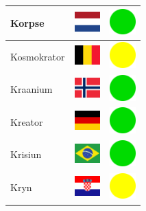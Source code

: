 \documentclass[12pt, a4paper, twoside]{report}
\begin{document}
\begin{center}
\begin{longtable}{|p{5cm}|p{2cm}|p{2cm}|}
 Korpse                                                     & \includegraphics[width=1cm]{../4x3/nl} &   \includegraphics[width=1cm]{../likes/y} \\ \hline
 Kosmokrator                                                & \includegraphics[width=1cm]{../4x3/be} &   \includegraphics[width=1cm]{../likes/m} \\ \hline
 Kraanium                                                   & \includegraphics[width=1cm]{../4x3/no} &   \includegraphics[width=1cm]{../likes/y} \\ \hline
 Kreator                                                    & \includegraphics[width=1cm]{../4x3/de} &   \includegraphics[width=1cm]{../likes/y} \\ \hline
 Krisiun                                                    & \includegraphics[width=1cm]{../4x3/br} &   \includegraphics[width=1cm]{../likes/y} \\ \hline
 Kryn                                                       & \includegraphics[width=1cm]{../4x3/hr} &   \includegraphics[width=1cm]{../likes/m} \\ \hline

\end{longtable}
\end{center}
\end{document}
